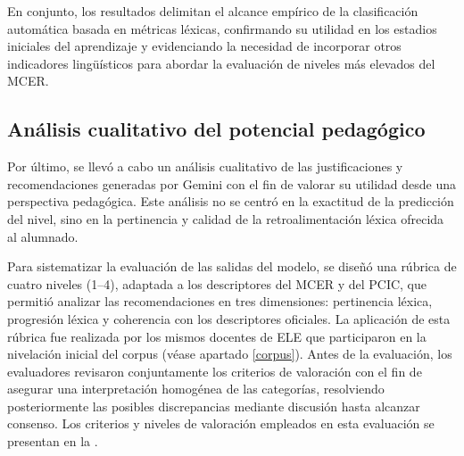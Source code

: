 \documentclass[spanish]{textolivre}
\begin{document}
En conjunto, los resultados delimitan el alcance empírico de la clasificación automática basada en métricas léxicas, confirmando su utilidad en los estadios iniciales del aprendizaje y evidenciando la necesidad de incorporar otros indicadores lingüísticos para abordar la evaluación de niveles más elevados del MCER.

\subsection{Análisis cualitativo del potencial pedagógico}

Por último, se llevó a cabo un análisis cualitativo de las justificaciones y recomendaciones generadas por Gemini con el fin de valorar su utilidad desde una perspectiva pedagógica. Este análisis no se centró en la exactitud de la predicción del nivel, sino en la pertinencia y calidad de la retroalimentación léxica ofrecida al alumnado.

Para sistematizar la evaluación de las salidas del modelo, se diseñó una rúbrica de cuatro niveles (1–4), adaptada a los descriptores del MCER y del PCIC, que permitió analizar las recomendaciones en tres dimensiones: pertinencia léxica, progresión léxica y coherencia con los descriptores oficiales. La aplicación de esta rúbrica fue realizada por los mismos docentes de ELE que participaron en la nivelación inicial del corpus (véase apartado \ref{corpus}). Antes de la evaluación, los evaluadores revisaron conjuntamente los criterios de valoración con el fin de asegurar una interpretación homogénea de las categorías, resolviendo posteriormente las posibles discrepancias mediante discusión hasta alcanzar consenso. Los criterios y niveles de valoración empleados en esta evaluación se presentan en la .
\end{document}
